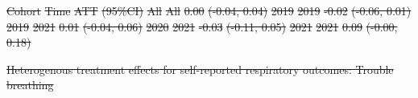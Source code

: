 \documentclass[
  letterpaper,
  DIV=11,
  numbers=noendperiod]{scrartcl}
\makeatletter
\renewenvironment{table}%
   {\renewcommand\familydefault\sfdefault
    \@float{table}}
   {\end@float}
\providecommand{\DIFdeltex}[1]{{\protect\color{red}\sout{#1}}}                      %
\providecommand{\DIFdelFL}[1]{\DIFdel{#1}} %
\providecommand{\DIFdel}[1]{\texorpdfstring{\DIFdeltex{#1}}{}} %
\makeatother
\begin{document}
\DIFdelFL{Cohort }%
\DIFdelFL{Time }%
\DIFdelFL{ATT }%
\DIFdelFL{(95\%CI)}%
\DIFdelFL{All }%
\DIFdelFL{All }%
\DIFdelFL{0.00 }%
\DIFdelFL{(-0.04, 0.04)}%
\DIFdelFL{2019 }%
\DIFdelFL{2019 }%
\DIFdelFL{-0.02 }%
\DIFdelFL{(-0.06, 0.01)}%
\DIFdelFL{2019 }%
\DIFdelFL{2021 }%
\DIFdelFL{0.01 }%
\DIFdelFL{(-0.04, 0.06)}%
\DIFdelFL{2020 }%
\DIFdelFL{2021 }%
\DIFdelFL{-0.03 }%
\DIFdelFL{(-0.11, 0.05)}%
\DIFdelFL{2021 }%
\DIFdelFL{2021 }%
\DIFdelFL{0.09 }%
\DIFdelFL{(-0.00, 0.18)}%

{%
\DIFdelFL{Heterogenous treatment effects for self-reported respiratory outcomes:
Trouble breathing }}%
\end{document}

